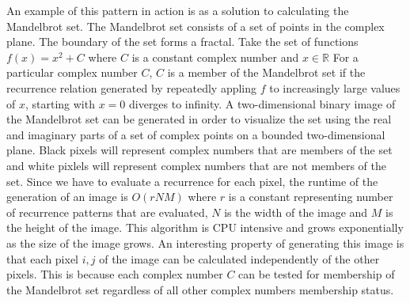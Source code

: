 An example of this pattern in action is as a solution to calculating the Mandelbrot set.
The Mandelbrot set consists of a set of points in the complex plane. The boundary of the set forms a fractal.
Take the set of functions \begin{math}f(x)=x^2 + C\end{math} where \begin{math}C\end{math} is a constant complex number
and \begin{math}x \in \mathbb{R}\end{math} 
For a particular complex number \begin{math}C\end{math}, \begin{math}C\end{math} is a member of the Mandelbrot set if
the recurrence relation generated by repeatedly appling \begin{math}f\end{math} to increasingly large values of \begin{math}x\end{math}, starting with \begin{math}x=0\end{math} diverges to infinity. 
A two-dimensional binary image of the Mandelbrot set can be generated in order to visualize the set using the real and imaginary parts of a set of 
complex points on a bounded two-dimensional plane. 
Black pixels will represent complex numbers that are members of the set and white pixlels will represent complex numbers that are not members of the set.
Since we have to evaluate a recurrence for each pixel, the runtime of the generation of an image is \begin{math}O(rNM)\end{math} where \begin{math}r\end{math} is a constant representing number of recurrence patterns that are evaluated, \begin{math}N\end{math} is the width of the image and \begin{math}M\end{math} is the height of the image.
This algorithm is CPU intensive and grows exponentially as the size of the image grows. 
An interesting property of generating this image is that each pixel \begin{math}i,j\end{math} of the image can be calculated independently of the other pixels.
This is because each complex number \begin{math}C\end{math} can be tested for membership of the Mandelbrot set regardless of all other complex numbers membership status.
 
